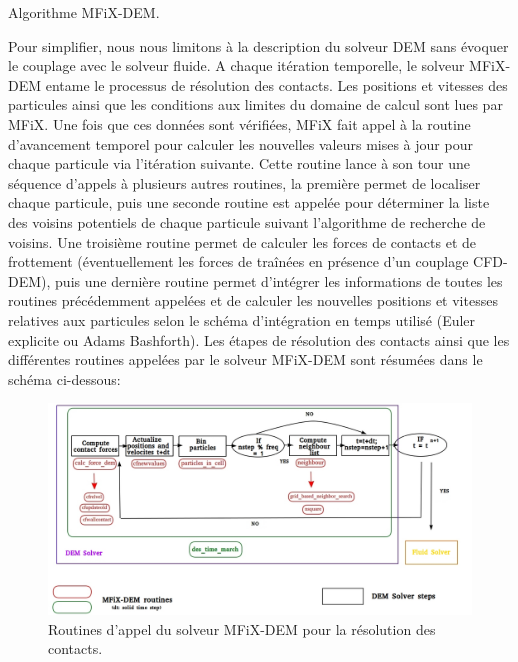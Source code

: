 \begin{algorithm}[H]
 \SetAlgoLined %
 \caption{Algorithme MFiX-DEM.}
\end{algorithm}
\vspace{0.2cm}
Pour simplifier, nous nous limitons à la description du solveur DEM sans évoquer le couplage avec le solveur fluide. A chaque itération temporelle, le solveur MFiX-DEM entame le processus de résolution des contacts. Les positions et vitesses des particules ainsi que les conditions aux limites du domaine de calcul sont lues par MFiX. Une fois que ces données sont vérifiées, MFiX fait appel à la routine d'avancement temporel pour calculer les nouvelles valeurs mises à jour pour chaque particule via l'itération suivante. Cette routine lance à son tour une séquence d'appels à plusieurs autres routines, la première permet de localiser chaque particule, puis une seconde routine est appelée pour déterminer la liste des voisins potentiels de chaque particule suivant l'algorithme de recherche de voisins. Une troisième routine permet de calculer les forces de contacts et de frottement (éventuellement les forces de traînées en présence d'un couplage CFD-DEM), puis une dernière routine permet d'intégrer les informations de toutes les routines précédemment appelées et de calculer les nouvelles positions et vitesses relatives aux particules selon le schéma d'intégration en temps utilisé (Euler explicite ou Adams Bashforth). Les étapes de résolution des contacts ainsi que les différentes routines appelées par le solveur MFiX-DEM sont résumées dans le schéma ci-dessous:

\begin{figure}[!h]
        \centering
        \includegraphics[width=1.0\textwidth]{chapitres/chapitre_4/figures/dem_solver_scheme.jpg}
        \caption{Routines d'appel du solveur MFiX-DEM pour la résolution des contacts.}
        \label{fig6}    
    \end{figure}

